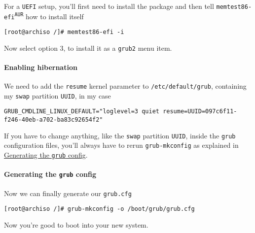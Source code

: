 \documentclass[9pt]{report}
\newenvironment{NOTE}
{\begin{tcolorbox}[colback=admonitionBG,coltitle=draculaFG,colframe=draculaBlue,colbacktitle=draculaBlue,title=NOTE]}
{\end{tcolorbox}}
\begin{document}
For a \texttt{UEFI} setup, you’ll first need to install the package and then tell \texttt{memtest86-efi\textsuperscript{\texttt{AUR}}} how to install itself


\begin{verbatim}
[root@archiso /]# memtest86-efi -i
\end{verbatim}

Now select option 3, to install it as a \texttt{grub2} menu item.



\newpage

\hypertarget{x-enabling-hibernation}{\paragraph{Enabling hibernation}}
We need to add the \texttt{resume} kernel parameter to \texttt{/etc/default/grub}, containing my \texttt{swap} partition \texttt{UUID}, in my case


\begin{verbatim}
GRUB_CMDLINE_LINUX_DEFAULT="loglevel=3 quiet resume=UUID=097c6f11-f246-40eb-a702-ba83c92654f2"
\end{verbatim}

\begin{NOTE}
    If you have to change anything, like the \texttt{swap} partition \texttt{UUID}, inside the \texttt{grub} configuration files, you’ll always have to rerun \texttt{grub-mkconfig} as explained in \hyperlink{generating-the-grub-config}{Generating the \texttt{grub} config}.

\end{NOTE}
\hypertarget{x-generating-the-grub-config}{\paragraph{Generating the \texttt{grub} config}}
Now we can finally generate our \texttt{grub.cfg}


\begin{verbatim}
[root@archiso /]# grub-mkconfig -o /boot/grub/grub.cfg
\end{verbatim}

Now you’re good to boot into your new system.



\newpage
\end{document}
